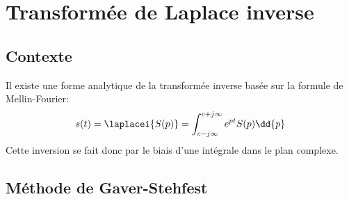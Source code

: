 \chapter{Transformée de Laplace inverse~\label{annexe-invL}}

\section{Contexte}

Il existe une forme analytique de la transformée inverse basée sur
la formule de Mellin-Fourier\cite{Ostertag}:
$$
s(t)=\laplacei{S(p)}=\int_{c-j\infty}^{c+j\infty} e^{pt}S(p)\dd{p}
$$
Cette inversion se fait donc par le biais d'une intégrale dans le plan
complexe.
\section{Méthode de Gaver-Stehfest}

